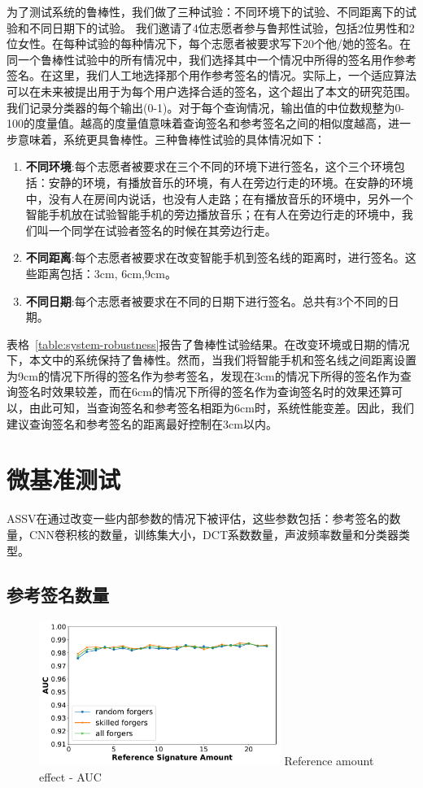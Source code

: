 为了测试系统的鲁棒性，我们做了三种试验：不同环境下的试验、不同距离下的试验和不同日期下的试验。 我们邀请了4位志愿者参与鲁邦性试验，包括2位男性和2位女性。在每种试验的每种情况下，每个志愿者被要求写下20个他/她的签名。在同一个鲁棒性试验中的所有情况中，我们选择其中一个情况中所得的签名用作参考签名。在这里，我们人工地选择那个用作参考签名的情况。实际上，一个适应算法可以在未来被提出用于为每个用户选择合适的签名，这个超出了本文的研究范围。我们记录分类器的每个输出(0-1)。对于每个查询情况，输出值的中位数规整为0-100的度量值。越高的度量值意味着查询签名和参考签名之间的相似度越高，进一步意味着，系统更具鲁棒性。三种鲁棒性试验的具体情况如下：

\begin{enumerate}[label=(\arabic*)]
    \item \textbf{不同环境}:每个志愿者被要求在三个不同的环境下进行签名，这个三个环境包括：安静的环境，有播放音乐的环境，有人在旁边行走的环境。在安静的环境中，没有人在房间内说话，也没有人走路；在有播放音乐的环境中，另外一个智能手机放在试验智能手机的旁边播放音乐；在有人在旁边行走的环境中，我们叫一个同学在试验者签名的时候在其旁边行走。
    \item \textbf{不同距离}:每个志愿者被要求在改变智能手机到签名线的距离时，进行签名。这些距离包括：3cm, 6cm,9cm。
    \item \textbf{不同日期}:每个志愿者被要求在不同的日期下进行签名。总共有3个不同的日期。
\end{enumerate}

表格~\ref{table:system-robustness}报告了鲁棒性试验结果。在改变环境或日期的情况下，本文中的系统保持了鲁棒性。然而，当我们将智能手机和签名线之间距离设置为9cm的情况下所得的签名作为参考签名，发现在3cm的情况下所得的签名作为查询签名时效果较差，而在6cm的情况下所得的签名作为查询签名时的效果还算可以，由此可知，当查询签名和参考签名相距为6cm时，系统性能变差。因此，我们建议查询签名和参考签名的距离最好控制在3cm以内。


\section{微基准测试}
ASSV在通过改变一些内部参数的情况下被评估，这些参数包括：参考签名的数量，CNN卷积核的数量，训练集大小，DCT系数数量，声波频率数量和分类器类型。

\subsection{参考签名数量}
\begin{figure}
  \centering
  \includegraphics[width=0.7\textwidth]{figure/rcount-auc-lines.pdf}
      {Reference amount effect - AUC}
  \label{fig:rcount-auc-lines}
\end{figure}

